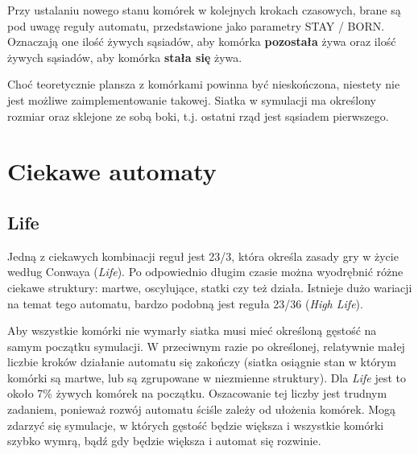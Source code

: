 \documentclass[12pt]{article}
\begin{document}
Przy ustalaniu nowego stanu komórek w kolejnych krokach czasowych, brane są pod uwagę reguły automatu, przedstawione jako parametry STAY / BORN. Oznaczają one ilość żywych sąsiadów, aby komórka \textbf{pozostała} żywa oraz ilość żywych sąsiadów, aby komórka \textbf{stała się} żywa.

Choć teoretycznie plansza z komórkami powinna być nieskończona, niestety nie jest możliwe zaimplementowanie takowej. Siatka w symulacji ma określony rozmiar oraz sklejone ze sobą boki, t.j. ostatni rząd jest sąsiadem pierwszego.

\section{Ciekawe automaty}
\subsection{Life}
Jedną z ciekawych kombinacji reguł jest 23/3, która określa zasady gry w życie według Conwaya (\textit{Life}). Po odpowiednio długim czasie można wyodrębnić różne ciekawe struktury: martwe, oscylujące, statki czy też działa. Istnieje dużo wariacji na temat tego automatu, bardzo podobną jest reguła 23/36 (\textit{High Life}).

Aby wszystkie komórki nie wymarły siatka musi mieć określoną gęstość na samym początku symulacji. W przeciwnym razie po określonej, relatywnie małej liczbie kroków działanie automatu się zakończy (siatka osiągnie stan w którym komórki są martwe, lub są zgrupowane w niezmienne struktury). Dla \textit{Life} jest to około 7\% żywych komórek na początku. Oszacowanie tej liczby jest trudnym zadaniem, ponieważ rozwój automatu ściśle zależy od ułożenia komórek. Mogą zdarzyć się symulacje, w których gęstość będzie większa i wszystkie komórki szybko wymrą, bądź gdy będzie większa i automat się rozwinie.
\end{document}
